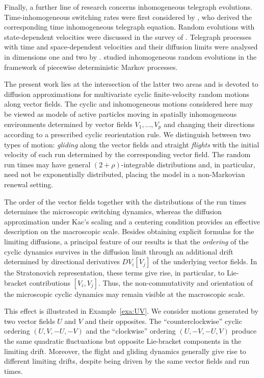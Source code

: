 \documentclass[10pt]{article}
\newcommand{\1}{1\!\!\!\;{\rm I}}
\theoremstyle{plain}
\theoremstyle{definition}
\numberwithin{equation}{section}
\begin{document}
Finally, a further line of research concerns inhomogeneous telegraph evolutions. Time-in\-ho\-mo\-ge\-neous switching
rates were first considered by \cite{kaplan1964differential}, who derived the corresponding
time inhomogeneous telegraph equation. Random evolutions with state-dependent velocities
were discussed in the survey of \cite{hersh1974random}. Telegraph processes with time and space-dependent velocities
and their diffusion limits were analysed in dimensions one and two by \cite{ratanov1999telegraph,orsingher2008random,orsingher2026one}.
\cite{benaim2015qualitative,benaim2019random} studied inhomogeneous random evolutions in the framework of
piecewise deterministic Markov processes.




The present work lies at the intersection of the latter two areas and is devoted to diffusion
approximations for multivariate cyclic finite-velocity random motions along vector fields.
The cyclic and inhomogeneous motions considered here may be viewed as models of active particles
moving in spatially inhomogeneous environments determined by vector fields $V_1,\ldots,V_p$ and changing
their directions according to a prescribed cyclic reorientation rule. We distinguish between two types
of motion: \emph{gliding} along the vector fields and straight \emph{flights} with the
initial velocity of each run determined by the corresponding vector field. The random run times may
have general $(2+\rho)$-integrable distributions and, in particular, need not be exponentially
distributed, placing the model in a non-Markovian renewal setting.

The order of the vector fields together with the distributions of the run times determines the
microscopic switching dynamics, whereas the diffusion approximation under Kac's scaling and a
centering condition provides an effective description on the macroscopic scale. Besides obtaining
explicit formulas for the limiting diffusions, a principal feature of our results is that the \emph{ordering}
of the cyclic dynamics survives in the diffusion limit through an additional drift determined by directional
derivatives $DV_i[V_j]$ of the underlying vector fields. In the Stratonovich representation, these terms give rise,
in particular, to Lie-bracket contributions $[V_i,V_j]$. Thus, the non-commutativity and orientation of
the microscopic cyclic dynamics may remain visible at the macroscopic scale.

This effect is illustrated in Example~\ref{exa:UV}. We consider motions generated by two vector
fields $U$ and $V$ and their opposites. The ``counterclockwise'' cyclic ordering
$(U,V,-U,-V)$
and the ``clockwise'' ordering
$(U,-V,-U,V)$
produce the same quadratic fluctuations but opposite Lie-bracket components in the limiting drift.
Moreover, the flight and gliding dynamics generally give rise to different limiting drifts,
despite being driven by the same vector fields and run times.
\end{document}
